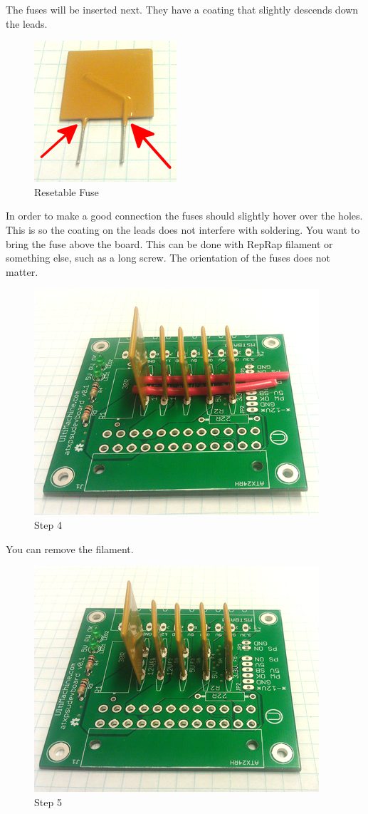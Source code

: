 The fuses will be inserted next. They have a coating that slightly
descends down the leads.

\begin{figure}[H]
\centering
\includegraphics{./png/fuse.png}
\caption{Resetable Fuse}
\end{figure}

In order to make a good connection the fuses should slightly hover over
the holes. This is so the coating on the leads does not interfere with
soldering. You want to bring the fuse above the board. This can be done
with RepRap filament or something else, such as a long screw. The
orientation of the fuses does not matter.

\begin{figure}[H]
\centering
\includegraphics{./png/step-04.png}
\caption{Step 4}
\end{figure}

You can remove the filament.

\begin{figure}[H]
\centering
\includegraphics{./png/step-05.png}
\caption{Step 5}
\end{figure}

